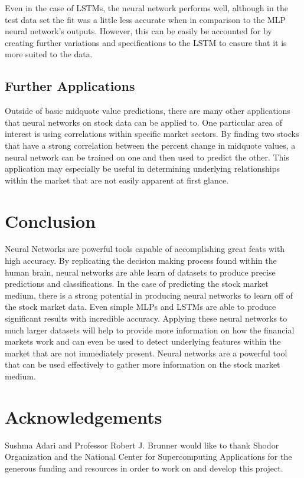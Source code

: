 Even in the case of LSTMs, the neural network performs well, although in the test data set the fit was a little less accurate when in comparison to the MLP neural network's outputs. However, this can be easily be accounted for by creating further variations and specifications to the LSTM to ensure that it is more suited to the data.
\subsection{Further Applications}\label{sec:data}

Outside of basic midquote value predictions, there are many other applications that neural networks on stock data can be applied to. One particular area of interest is using correlations within specific market sectors. By finding two stocks that have a strong correlation between the percent change in midquote values, a neural network can be trained on one and then used to predict the other. This application may especially be useful in determining underlying relationships within the market that are not easily apparent at first glance.  

\section{Conclusion}

Neural Networks are powerful tools capable of accomplishing great feats with high accuracy. By replicating the decision making process found within the human brain, neural networks are able learn of datasets to produce precise predictions and classifications. In the case of predicting the stock market medium, there is a strong potential in producing  neural networks to learn off of the stock market data. Even simple MLPs and LSTMs are able to produce significant results with incredible accuracy. Applying these neural networks to much larger datasets will help to provide more information on how the financial markets work and can even be used to detect underlying features within the market that are not immediately present. Neural networks are a powerful tool that can be used effectively to gather more information on the stock market medium. 

\section{Acknowledgements}

Sushma Adari and Professor Robert J. Brunner would like to thank Shodor Organization and the National Center for Supercomputing Applications for the generous funding and resources in order to work on and develop this project. 
